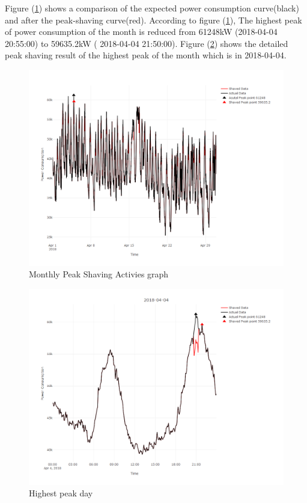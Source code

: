 \documentclass[
]{article}
\begin{document}
Figure (\ref{fig:fig2}) shows a comparison of the expected power
consumption curve(black) and after the peak-shaving curve(red).
According to figure (\ref{fig:fig2}), The highest peak of power
consumption of the month is reduced from {61248}kW ({2018-04-04
20:55:00}) to { 59635.2}kW ({ 2018-04-04 21:50:00}). Figure
(\ref{fig:fig3}) shows the detailed peak shaving result of the highest
peak of the month which is in 2018-04-04.

\begin{figure}[H]
\includegraphics[width=1\linewidth]{monthly_shaved} \caption{Monthly Peak Shaving Activies graph\label{fig2}}\label{fig:fig2}
\end{figure}

\begin{figure}[H]
\includegraphics[width=1\linewidth]{daily} \caption{Highest peak day\label{fig3}}\label{fig:fig3}
\end{figure}
\end{document}

